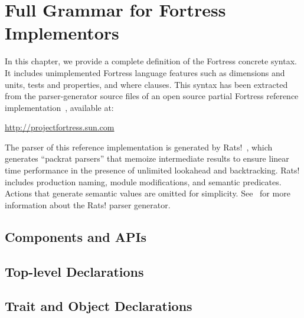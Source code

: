 %
%
%
%

\chapter{Full Grammar for Fortress Implementors}


In this chapter, we provide a complete definition of the Fortress concrete
syntax.  It includes unimplemented Fortress language features
such as dimensions and units, tests and properties, and where
clauses.  This syntax has been extracted from the parser-generator source
files of an open source partial Fortress reference
implementation~\cite{FortressInterpreter}, available at:

\begin{center}
\url{http://projectfortress.sun.com}
\end{center}

The parser of this reference implementation is generated by Rats!~\cite{Rats},
which generates ``packrat parsers'' that memoize intermediate results to
ensure linear time performance in the presence of unlimited lookahead and
backtracking.  Rats! includes production naming, module modifications, and
semantic predicates.  Actions that generate
semantic values are omitted for simplicity. See~\cite{Rats} for more
information about the Rats! parser generator.

\footnotesize

\section{Components and APIs}


\section{Top-level Declarations}


\section{Trait and Object Declarations}


